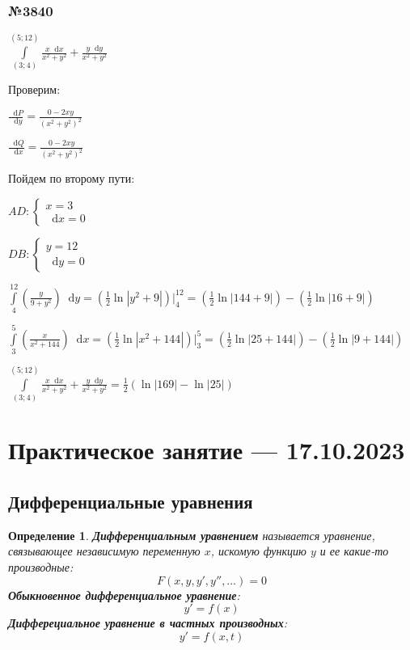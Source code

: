 \documentclass{article}
\newcommand*\diff{\mathop{}\!\mathrm{d}}
\newtheorem{definition}{Определение}
\begin{document}
\subsubsection{№3840}

$\int\limits_{(3;4)}^{(5;12)} \frac{x \diff x}{x^2 + y^2} + \frac{y \diff y}{x^2 + y^2}$

Проверим:

$\frac{\diff P}{\diff y} = \frac{0 - 2xy}{(x^2 + y^2)^2}$

$\frac{\diff Q}{\diff x} = \frac{0 - 2xy}{(x^2 + y^2)^2}$

Пойдем по второму пути:

$AD: \begin{cases}
    x = 3 \\
    \diff x = 0
\end{cases}$

$DB: \begin{cases}
    y = 12 \\
    \diff y = 0
\end{cases}$

$\int\limits_{4}^{12} (\frac{y}{9 + y^2}) \diff y = (\frac{1}{2} \ln |y^2 + 9|) \bigg|_{4}^{12} = (\frac{1}{2} \ln |144 + 9|) - (\frac{1}{2} \ln |16 + 9|)$

$\int\limits_{3}^{5} (\frac{x}{x^2 + 144}) \diff x = (\frac{1}{2} \ln |x^2 + 144|) \bigg|_{3}^{5} = (\frac{1}{2} \ln |25 + 144|) - (\frac{1}{2} \ln |9 + 144|)$

$\int\limits_{(3;4)}^{(5;12)} \frac{x \diff x}{x^2 + y^2} + \frac{y \diff y}{x^2 + y^2} = \frac{1}{2} (\ln|169| - \ln |25|)$

\section{Практическое занятие — 17.10.2023}

\subsection{Дифференциальные уравнения}

\begin{definition}
    \textbf{Дифференциальным уравнением} называется уравнение, связывающее независимую переменную $x$, искомую функцию $y$ и ее какие-то производные:
    $$
    F(x, y, y', y'', \dots) = 0
    $$
    \textbf{Обыкновенное дифференциальное уравнение}:
    $$
    y' = f(x)
    $$
    \textbf{Дифферециальное уравнение в частных производных}:
    $$
    y' = f(x, t)
    $$
\end{definition}
\end{document}
